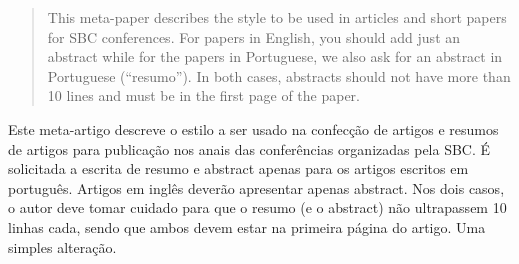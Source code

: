 \begin{abstract}
    This meta-paper describes the style to be used in articles and short papers
    for SBC conferences. For papers in English, you should add just an abstract
    while for the papers in Portuguese, we also ask for an abstract in
    Portuguese (``resumo''). In both cases, abstracts should not have more than
    10 lines and must be in the first page of the paper.
  \end{abstract}
       
  \begin{resumo} 
    Este meta-artigo descreve o estilo a ser usado na confecção de artigos e
    resumos de artigos para publicação nos anais das conferências organizadas
    pela SBC. É solicitada a escrita de resumo e abstract apenas para os artigos
    escritos em português. Artigos em inglês deverão apresentar apenas abstract.
    Nos dois casos, o autor deve tomar cuidado para que o resumo (e o abstract)
    não ultrapassem 10 linhas cada, sendo que ambos devem estar na primeira página do artigo. Uma simples alteração.
  \end{resumo}
